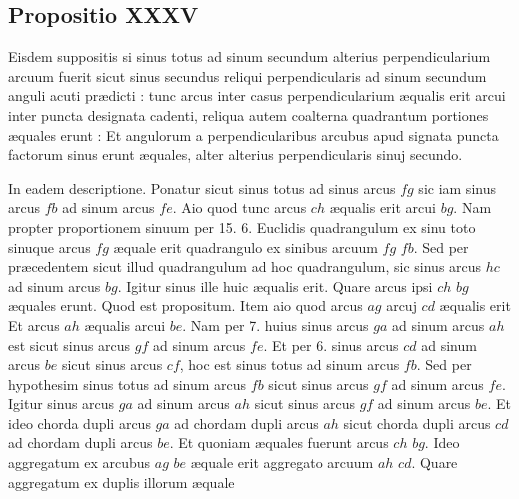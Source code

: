 \documentclass[11pt,a4paper]{article}
\begin{document}

\subsection*{Propositio XXXV}

Eisdem suppositis si sinus totus ad sinum secundum alterius perpendicularium arcuum fuerit sicut sinus secundus reliqui perpendicularis ad sinum secundum anguli acuti prædicti : tunc arcus inter casus perpendicularium æqualis erit arcui inter puncta designata cadenti, reliqua autem coalterna quadrantum portiones æquales erunt : Et angulorum a perpendicularibus arcubus apud signata puncta factorum sinus erunt æquales, alter alterius perpendicularis sinuj secundo.

In eadem descriptione. Ponatur sicut sinus totus ad sinus arcus $fg$ sic iam sinus arcus $fb$ ad sinum arcus $fe$. Aio quod tunc arcus $ch$ æqualis erit arcui $bg$. Nam propter proportionem sinuum per 15. 6. Euclidis quadrangulum ex sinu toto sinuque arcus $fg$ æquale erit quadrangulo ex sinibus arcuum $fg$ $fb$. Sed per præcedentem sicut illud quadrangulum ad hoc quadrangulum, sic sinus arcus $hc$ ad sinum arcus $bg$. Igitur sinus ille huic æqualis erit. Quare arcus ipsi $ch$ $bg$ æquales erunt. Quod est propositum. Item aio quod arcus $ag$ arcuj $cd$ æqualis erit Et arcus $ah$ æqualis arcui $be$. Nam per 7. huius sinus arcus $ga$ ad sinum arcus $ah$ est sicut sinus arcus $gf$ ad sinum arcus $fe$. Et per 6. sinus arcus $cd$ ad sinum arcus $be$ sicut sinus arcus $cf$, hoc est sinus totus ad sinum arcus $fb$. Sed per hypothesim sinus totus ad sinum arcus $fb$ sicut sinus arcus $gf$ ad sinum arcus $fe$. Igitur sinus arcus $ga$ ad sinum arcus $ah$ sicut sinus arcus $gf$ ad sinum arcus $be$. Et ideo chorda dupli arcus $ga$ ad chordam dupli arcus $ah$ sicut chorda dupli arcus $cd$ ad chordam dupli arcus $be$. Et quoniam æquales fuerunt arcus $ch$ $bg$. Ideo aggregatum ex arcubus $ag$ $be$ æquale erit aggregato arcuum $ah$ $cd$. Quare aggregatum ex duplis illorum æquale
\end{document}
